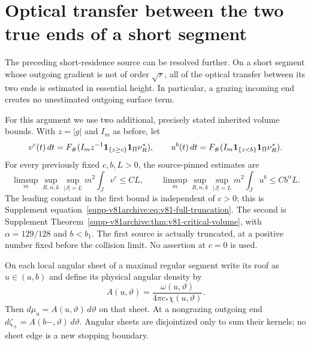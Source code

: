 \section{Optical transfer between the two true ends of a short segment}
\label{sec:v84-pairs}
The preceding short-residence source can be resolved further. On a
short segment whose outgoing gradient is not of order $\sqrt r$,
all of the optical transfer between its two ends is estimated in
essential height. In particular, a grazing incoming end creates no
unestimated outgoing surface term.

For this argument we use two additional, precisely stated inherited
volume bounds. With $z=|g|$ and $I_m$ as before, let
\begin{equation}\label{eq:v84-auxiliary-sources}
 v^c(t)\,dt=F_\#(I_m z^{-1}\one_{\{z\ge c\}}\one_\Pi\nu_R^*),
 \qquad
 u^b(t)\,dt=F_\#(I_m\one_{\{z<b\}}\one_\Pi\nu_R^*).
\end{equation}
For every previously fixed $c,b,L>0$, the source-pinned estimates are
\begin{equation}\label{eq:v84-truncated-input}
 \limsup_m\sup_{R,n,k}\sup_{|J|=L}m^2\int_Jv^c\le CL,
 \qquad
 \limsup_m\sup_{R,n,k}\sup_{|J|=L}m^2\int_Ju^b\le Cb^\alpha L.
\end{equation}
The leading constant in the first bound is independent of $c>0$;
this is Supplement equation~\eqref{supp-v81archive:eq:v81-full-truncation}.
The second is Supplement Theorem~\ref{supp-v81archive:thm:v81-critical-volume},
with $\alpha=129/128$ and $b<b_1$. The first source is actually
truncated, at a positive number fixed before the collision limit.
No assertion at $c=0$ is used.

On each local angular sheet of a maximal regular segment write its
roof as $u\in(a,b)$ and define its physical angular density by
\begin{equation}\label{eq:v84-angular-density}
 A(u,\vartheta)=\frac{\omega(u,\vartheta)}
                         {4\pi c_*\chi(u,\vartheta)}.
\end{equation}
Then $d\mu_u=A(u,\vartheta)\,d\vartheta$ on that sheet. At a
nongrazing outgoing end $d\zeta_+=A(b-,\vartheta)\,d\vartheta$.
Angular sheets are disjointized only to sum their kernels; no sheet
edge is a new stopping boundary.

